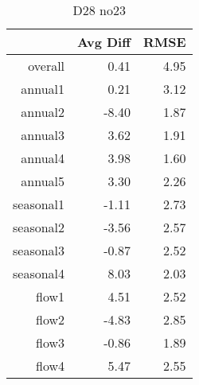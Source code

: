 \begin{table}[H]
\centering
\begin{tabular}{rrr}
  \hline
 & Avg Diff & RMSE \\ 
  \hline
overall & 0.41 & 4.95 \\ 
  annual1 & 0.21 & 3.12 \\ 
  annual2 & -8.40 & 1.87 \\ 
  annual3 & 3.62 & 1.91 \\ 
  annual4 & 3.98 & 1.60 \\ 
  annual5 & 3.30 & 2.26 \\ 
  seasonal1 & -1.11 & 2.73 \\ 
  seasonal2 & -3.56 & 2.57 \\ 
  seasonal3 & -0.87 & 2.52 \\ 
  seasonal4 & 8.03 & 2.03 \\ 
  flow1 & 4.51 & 2.52 \\ 
  flow2 & -4.83 & 2.85 \\ 
  flow3 & -0.86 & 1.89 \\ 
  flow4 & 5.47 & 2.55 \\ 
   \hline
\end{tabular}
\caption{D28 no23} 
\end{table}
